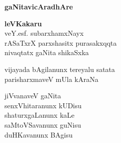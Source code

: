 \begin{center}
\LARGE{\bf{gaNitavicAradhAre}}
\end{center}

\medskip

\begin{center}
{\bf  leVKakaru}\\
  veY.esf. subarxhamxNayx\\
  rASaTxrX parxshasitx purasakxqqta\\
  nivaqtatx gaNita shikaSxka
\end{center}

\medskip

\begin{center}
  vijayada bAgilanunx tereyalu satata\\
  parisharxmaveV mUla kAraNa
\end{center}

\medskip

\begin{center}
  jiVvanaveV gaNita\\
  senxVhitaranunx kUDisu\\
  shaturxgaLanunx kaLe\\
  saMtoVSavanunx guNisu\\
  duHKavanunx BAgisu
\end{center}
